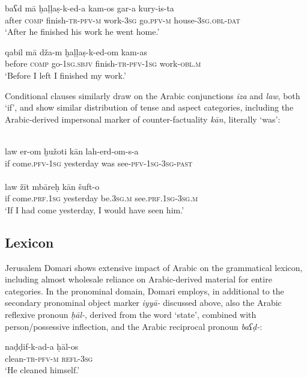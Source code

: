 \documentclass[output=paper]{langsci/langscibook}
\begin{document}
\ea\label{after} \gll baʕd mā ḫaḷḷaṣ-k-ed-a kam-os gar-a kury-is-ta\\
     after \textsc{comp} finish-\textsc{tr-pfv-m} work-\textsc{3sg} go.\textsc{pfv-m} house-\textsc{3sg.obl-dat}\\
\glt     ‘After he finished his work he went home.’
\z

\ea\label{before} \gll qabil mā dža-m ḫaḷḷaṣ-k-ed-om kam-as\\
       before  \textsc{comp} go-\textsc{1sg.sbjv} finish-\textsc{tr-pfv-1sg} work-\textsc{obl.m}\\
\glt     ‘Before I left I finished my work.’
\z

Conditional clauses similarly draw on the Arabic conjunctions \textit{iza} and \textit{law}, both ‘if’, and show similar distribution of tense and aspect categories, including the Arabic-derived impersonal marker of counter-factuality \textit{kān,} literally ‘was’:

\ea\label{ex:matras:}
\ea
{}\\
\gll law er-om ḫužoti kān lah-erd-om-s-a \\
       if come.\textsc{pfv-1sg} yesterday was see-\textsc{pfv-1sg-3sg-past}\\
\ex
{}\\
\gll law žīt mbāreḥ kān šuft-o  \\
       if come.\textsc{prf.1sg} yesterday be.\textsc{3sg.m} see.\textsc{prf.1sg-3sg.m}\\
\glt   ‘If I had come yesterday, I would have seen him.’
\z
\z

\subsection{Lexicon
}

Jerusalem Domari shows extensive impact of Arabic on the grammatical lexicon, including almost wholesale reliance on Arabic-derived material for entire categories. In the pronominal domain, Domari employs, in additional to the secondary pronominal object marker \textit{iyyā-} discussed above, also the Arabic reflexive pronoun \textit{ḥāl-}, derived from the word ‘state’, combined with person/possessive inflection, and the Arabic reciprocal pronoun \textit{baʕḍ-}:

\ea \gll naḍḍif-k-ad-a ḥāl-os\\
     clean-\textsc{tr-pfv-m} \textsc{refl-3sg}\\
\glt ‘He cleaned himself.’
\z
\end{document}
